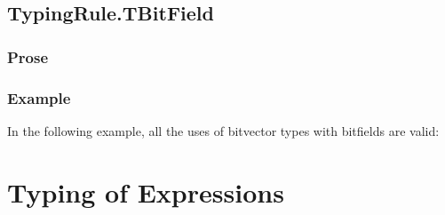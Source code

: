 \documentclass{book}
\begin{document}
\begin{itemize}




\section{TypingRule.TBitField \label{sec:TypingRule.TBitField}}

\subsection{Prose}


\subsection{Example}
In the following example, all the uses of bitvector types with bitfields are valid:







\chapter{Typing of Expressions}


\end{itemize}
\end{document}
